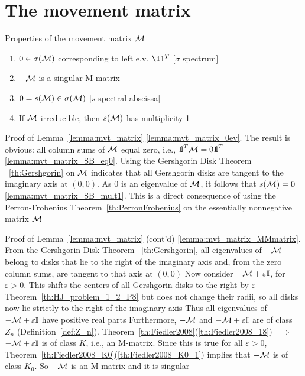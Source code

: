 \documentclass[aspectratio=169]{beamer}
\begin{document}
\section{The movement matrix}
\begin{frame}{Properties of the movement matrix $\mathcal{M}$}
	\begin{lemma}\label{lemma:mvt_matrix}
		\begin{enumerate}
			\item $0\in\sigma(\mathcal{M})$ corresponding to left e.v. $\11^T$ \hfill[$\sigma$ spectrum] \label{lemma:mvt_matrix_0ev}
			\item $-\mathcal{M}$ is a singular M-matrix \label{lemma:mvt_matrix_MMmatrix}
			\item $0=s(\mathcal{M})\in\sigma(\mathcal{M})$ \hfill[$s$ spectral abscissa] \label{lemma:mvt_matrix_SB_eq0}
			\item If $\mathcal{M}$ irreducible, then $s(\mathcal{M})$ has multiplicity 1 \label{lemma:mvt_matrix_SB_mult1}
		\end{enumerate}
	\end{lemma}
\end{frame}



\begin{frame}{Proof of Lemma~\ref{lemma:mvt_matrix}}
\ref{lemma:mvt_matrix_0ev}. The result is obvious: all column sums of $\mathcal{M}$ equal zero, i.e., $\nbOne^T\M=0\nbOne^T$
\vfill
\noindent\ref{lemma:mvt_matrix_SB_eq0}. Using the Gershgorin Disk Theorem ~\ref{th:Gershgorin} on $\mathcal{M}$ indicates that all Gershgorin disks are tangent to the imaginary axis at $(0,0)$. As 0 is an eigenvalue of $\mathcal{M}$, it follows that $s(\mathcal{M})=0$
\vfill
\noindent\ref{lemma:mvt_matrix_SB_mult1}. This is a direct consequence of using the Perron-Frobenius Theorem~\ref{th:PerronFrobenius} on the essentially nonnegative matrix $\mathcal{M}$
\end{frame}

\begin{frame}{Proof of Lemma~\ref{lemma:mvt_matrix} (cont'd)}
	\noindent\ref{lemma:mvt_matrix_MMmatrix}. 
	From the Gershgorin Disk Theorem ~\ref{th:Gershgorin}, all eigenvalues of $-\mathcal{M}$ belong to disks that lie to the right of the imaginary axis and, from the zero column sums, are tangent to that axis at $(0,0)$
	\vfill
	Now consider $-\mathcal{M}+\varepsilon\mathbb{I}$, for $\varepsilon>0$. 
	This shifts the centers of all Gershgorin disks to the right by $\varepsilon$ Theorem~\ref{th:HJ_problem_1_2_P8} but does not change their radii, so all disks now lie strictly to the right of the imaginary axis 
	\vfill
	Thus all eigenvalues of $-\mathcal{M}+\varepsilon\mathbb{I}$ have positive real parts
	\vfill
	Furthermore, $-\mathcal{M}$ and $-\mathcal{M}+\varepsilon\mathbb{I}$ are of class $Z_n$ (Definition~\ref{def:Z_n}). 
	Theorem~\ref{th:Fiedler2008}(\ref{th:Fiedler2008_18}) $\implies$ $-\mathcal{M}+\varepsilon\mathbb{I}$ is of class $K$, i.e., an M-matrix.
	Since this is true for all $\varepsilon>0$, Theorem~\ref{th:Fiedler2008_K0}(\ref{th:Fiedler2008_K0_1}) implies that $-\mathcal{M}$ is of class $K_0$. 
	So $-\mathcal{M}$ is an M-matrix and it is singular
\end{frame}
\end{document}
